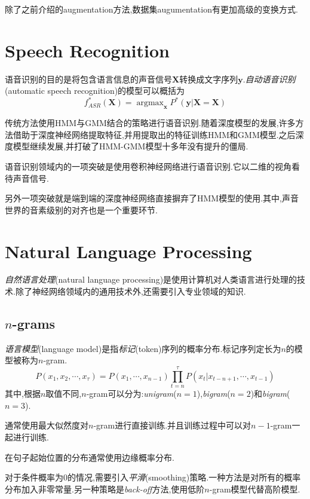 除了之前介绍的augmentation方法,数据集augumentation有更加高级的变换方式.

\section{Speech Recognition}

语音识别的目的是将包含语言信息的声音信号$\bm X$转换成文字序列$\bm y$.\textit{自动语音识别}(automatic speech recognition)的模型可以概括为
\begin{equation}
f^\ast_{ASR}(\bm X)=\mathop{\arg\max}_{\bm x}P^\ast(\bm y|\mathbf X=\bm X)
\end{equation}

传统方法使用HMM与GMM结合的策略进行语音识别.随着深度模型的发展,许多方法借助于深度神经网络提取特征,并用提取出的特征训练HMM和GMM模型.之后深度模型继续发展,并打破了HMM-GMM模型十多年没有提升的僵局.

语音识别领域内的一项突破是使用卷积神经网络进行语音识别.它以二维的视角看待声音信号.

另外一项突破就是端到端的深度神经网络直接摒弃了HMM模型的使用.其中,声音世界的音素级别的对齐也是一个重要环节.

\section{Natural Language Processing}

\textit{自然语言处理}(natural language processing)是使用计算机对人类语言进行处理的技术.除了神经网络领域内的通用技术外,还需要引入专业领域的知识.

\subsection{$n$-grams}

\textit{语言模型}(language model)是指\textit{标记}(token)序列的概率分布.标记序列定长为$n$的模型被称为$n$-gram.
\begin{equation}
P(x_1,x_2,\cdots,x_\tau)=P(x_1,\cdots,x_{n-1})\prod_{t=n}^\tau P(x_t|x_{t-n+1},\cdots,x_{t-1})
\end{equation}
其中,根据$n$取值不同,$n$-gram可以分为:\textit{unigram}($n=1$),\textit{bigram}($n=2$)和\textit{bigram}($n=3$).

通常使用最大似然度对$n$-gram进行直接训练.并且训练过程中可以对$n-1$-gram一起进行训练.

在句子起始位置的分布通常使用边缘概率分布.

对于条件概率为$0$的情况,需要引入\textit{平滑}(smoothing)策略.一种方法是对所有的概率分布加入非零常量.另一种策略是\textit{back-off}方法,使用低阶$n$-gram模型代替高阶模型.

